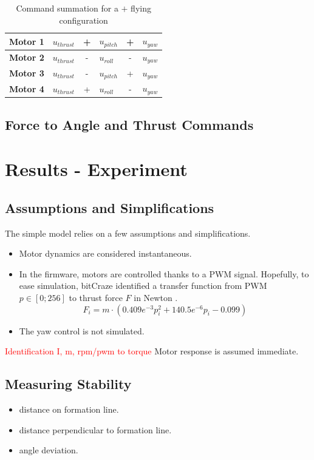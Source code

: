 \documentclass[a4paper, 12pt]{report}
\begin{document}
\begin{table}[htdp]
\caption{Command summation for a $+$  flying configuration}
\centering
\begin{tabular}{|l|l c l c l|}
\hline
\textbf{Motor 1} & $u_{thrust}$ & + &$u_{pitch}$ & + & $u_{yaw}$\\
\hline
\hline
\textbf{Motor 2} & $u_{thrust}$ & - & $u_{roll}$ & - & $u_{yaw}$ \\
\hline
\hline
\textbf{Motor 3} & $u_{thrust}$ & - & $u_{pitch}$ & + & $u_{yaw}$\\
\hline
\hline
\textbf{Motor 4} & $u_{thrust}$ & + & $u_{roll}$ & - & $u_{yaw}$ \\
\hline
\end{tabular}
\label{tab:motorDistribution}
\end{table}

\subsection{Force to Angle and Thrust Commands}

\newpage
\section{Results - Experiment}
\subsection{Assumptions and Simplifications}
The simple model relies on a few assumptions and simplifications.
\begin{itemize}
\item Motor dynamics are considered instantaneous.
\item In the firmware, motors are controlled thanks to a PWM signal. Hopefully, to ease simulation, bitCraze identified a transfer function from PWM $p\in[0;256]$ to thrust force $F$ in Newton \cite{bitcrazeWiki}.
\[ F_i = m \cdot (0.409e^{-3}p_i ^2 + 140.5 e^{-6}p_ i - 0.099 )\]
\item The yaw control is not simulated.
\end{itemize}
\textcolor{red}{Identification I, m, rpm/pwm to torque}
Motor response is assumed immediate.
\subsection{Measuring Stability}
\cite{Mataric2002}
\begin{itemize}
\item distance on formation line.
\item distance perpendicular to formation line.
\item angle deviation.
\end{itemize}
\end{document}
